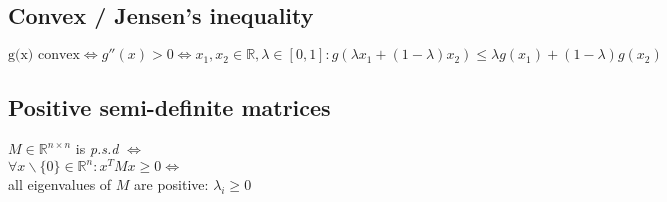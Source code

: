 \subsection*{Convex / Jensen's inequality}
$\text{g(x) convex} \Leftrightarrow g''(x) > 0 \Leftrightarrow x_1,x_2 \in \mathbb{R}, \lambda \in [0,1]: 
g(\lambda x_1 + (1-\lambda) x_2) \leq \lambda g(x_1) + (1-\lambda) g(x_2)$


\subsection*{Positive semi-definite matrices}
$M \in \mathbb{R}^{n\times n}$ is \textit{p.s.d} $\Leftrightarrow$\\
$\forall x \backslash \{0\} \in \mathbb{R}^n: x^TMx \geq 0 \Leftrightarrow$\\
all eigenvalues of $M$ are positive: $\lambda_i\geq 0$
